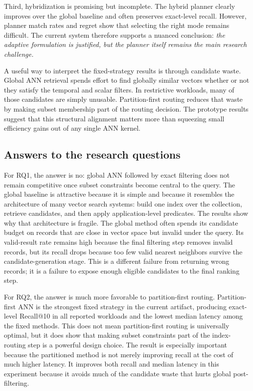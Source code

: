 \documentclass[sigconf,nonacm]{acmart}
\begin{document}
Third, hybridization is promising but incomplete. The hybrid planner clearly improves over the global baseline and often preserves exact-level recall. However, planner match rates and regret show that selecting the right mode remains difficult. The current system therefore supports a nuanced conclusion: \emph{the adaptive formulation is justified, but the planner itself remains the main research challenge.}

A useful way to interpret the fixed-strategy results is through candidate waste. Global ANN retrieval spends effort to find globally similar vectors whether or not they satisfy the temporal and scalar filters. In restrictive workloads, many of those candidates are simply unusable. Partition-first routing reduces that waste by making subset membership part of the routing decision. The prototype results suggest that this structural alignment matters more than squeezing small efficiency gains out of any single ANN kernel.

\subsection{Answers to the research questions}

For RQ1, the answer is no: global ANN followed by exact filtering does not remain competitive once subset constraints become central to the query. The global baseline is attractive because it is simple and because it resembles the architecture of many vector search systems: build one index over the collection, retrieve candidates, and then apply application-level predicates. The results show why that architecture is fragile. The global method often spends its candidate budget on records that are close in vector space but invalid under the query. Its valid-result rate remains high because the final filtering step removes invalid records, but its recall drops because too few valid nearest neighbors survive the candidate-generation stage. This is a different failure from returning wrong records; it is a failure to expose enough eligible candidates to the final ranking step.

For RQ2, the answer is much more favorable to partition-first routing. Partition-first ANN is the strongest fixed strategy in the current artifact, producing exact-level Recall@10 in all reported workloads and the lowest median latency among the fixed methods. This does not mean partition-first routing is universally optimal, but it does show that making subset constraints part of the index-routing step is a powerful design choice. The result is especially important because the partitioned method is not merely improving recall at the cost of much higher latency. It improves both recall and median latency in this experiment because it avoids much of the candidate waste that hurts global post-filtering.
\end{document}
